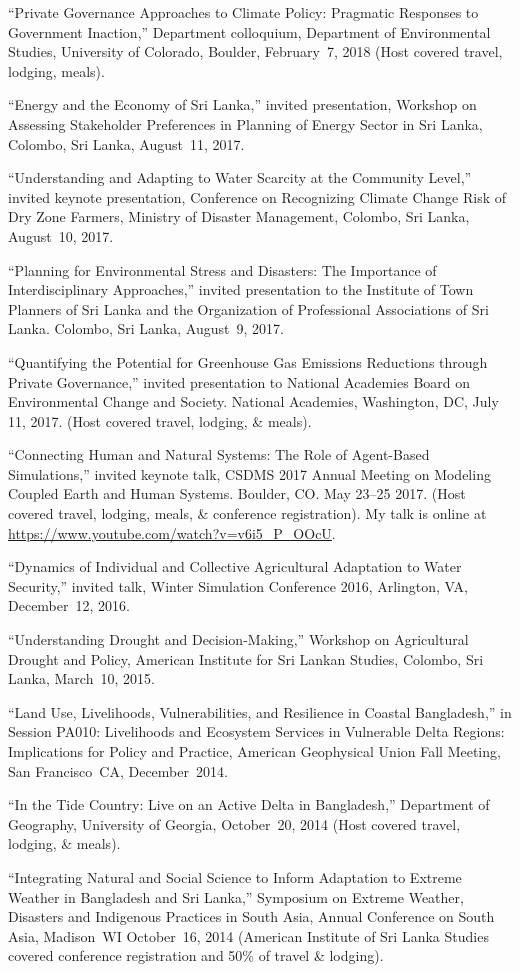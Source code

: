 \item ``Private Governance Approaches to Climate Policy: Pragmatic Responses to Government Inaction,'' Department colloquium, Department of Environmental Studies, University of Colorado, Boulder, February~7, 2018 (Host covered travel, lodging, meals).
\item ``Energy and the Economy of Sri Lanka,'' invited presentation, Workshop on Assessing Stakeholder Preferences in Planning of Energy Sector in Sri Lanka, Colombo, Sri Lanka, August~11, 2017.
\item ``Understanding and Adapting to Water Scarcity at the Community Level,'' invited keynote presentation, Conference on Recognizing Climate Change Risk of Dry Zone Farmers, Ministry of Disaster Management, Colombo, Sri Lanka, August~10, 2017.
\item ``Planning for Environmental Stress and Disasters: The Importance of Interdisciplinary Approaches,'' invited presentation to the Institute of Town Planners of Sri Lanka and the Organization of Professional Associations of Sri Lanka. Colombo, Sri Lanka, August~9, 2017.
\item ``Quantifying the Potential for Greenhouse Gas Emissions Reductions through Private Governance,'' invited presentation to National Academies Board on Environmental Change and Society. National Academies, Washington, DC, July 11, 2017. (Host covered travel, lodging, \& meals).
\item  ``Connecting Human and Natural Systems: The Role of Agent-Based Simulations,'' invited keynote talk, CSDMS 2017 Annual Meeting on Modeling Coupled Earth and Human Systems. Boulder, CO. May 23--25 2017. (Host covered travel, lodging, meals, \& conference registration). My talk is online at \url{https://www.youtube.com/watch?v=v6i5_P_OOcU}.
\item  ``Dynamics of Individual and Collective Agricultural Adaptation to Water Security,'' invited talk, Winter Simulation Conference 2016, Arlington, VA, December~12, 2016.
\item ``Understanding Drought and Decision-Making,'' Workshop on Agricultural Drought and Policy, American Institute for Sri Lankan Studies, Colombo, Sri Lanka, March~10, 2015.
\item ``Land Use, Livelihoods, Vulnerabilities, and Resilience in Coastal Bangladesh,'' in Session PA010: Livelihoods and Ecosystem Services in Vulnerable Delta Regions: Implications for Policy and Practice, American Geophysical Union Fall Meeting, San Francisco~CA, December~2014.
\item ``In the Tide Country: Live on an Active Delta in Bangladesh,'' Department of Geography, University of Georgia, October~20, 2014 (Host covered travel, lodging, \& meals).
\item ``Integrating Natural and Social Science to Inform Adaptation to Extreme Weather in Bangladesh and Sri Lanka,'' Symposium on Extreme Weather, Disasters and Indigenous Practices in South Asia, Annual Conference on South Asia, Madison~WI October~16, 2014 (American Institute of Sri Lanka Studies covered conference registration and 50\% of travel \& lodging).

